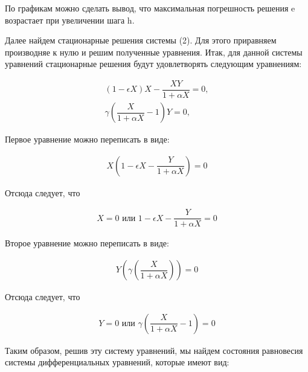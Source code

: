 \documentclass[a4paper,14pt]{extreport}
\begin{document}
По графикам можно сделать вывод, что максимальная погрешность решения e возрастает при увеличении шага h.

Далее найдем стационарные решения системы (2). Для этого приравняем производняе к нулю и решим полученные уравнения. Итак, для данной системы уравнений стационарные решения будут удовлетворять следующим уравнениям:

\begin{equation*}
    \begin{aligned}
        (1-\epsilon X) X-\dfrac{X Y}{1+\alpha X} = 0, \\
        \gamma \left(\dfrac{X}{1+\alpha X} - 1\right) Y = 0, 
    \end{aligned}
\end{equation*}

Первое уравнение можно переписать в виде:

\begin{equation*}
    \begin{aligned}
        X \left(1 - \epsilon X - \dfrac{Y}{1+\alpha X}\right) = 0
    \end{aligned}
\end{equation*}

Отсюда следует, что

\begin{equation*}
    \begin{aligned}
        X = 0 \text{ или } 1-\epsilon X -\dfrac{Y}{1+\alpha X} = 0
    \end{aligned}
\end{equation*}

Второе уравнение можно переписать в виде:

\begin{equation*}
    \begin{aligned}
       Y \left(\gamma \left(\dfrac{X}{1+\alpha X} \right) \right) = 0
    \end{aligned}
\end{equation*}

Отсюда следует, что

\begin{equation*}
    \begin{aligned}
       Y = 0 \text{ или } \gamma \left(\dfrac{X}{1+\alpha X} - 1 \right) = 0
    \end{aligned}
\end{equation*}

Таким образом, решив эту систему уравнений, мы найдем состояния равновесия системы дифференциальных уравнений, которые имеют вид:
\end{document}
